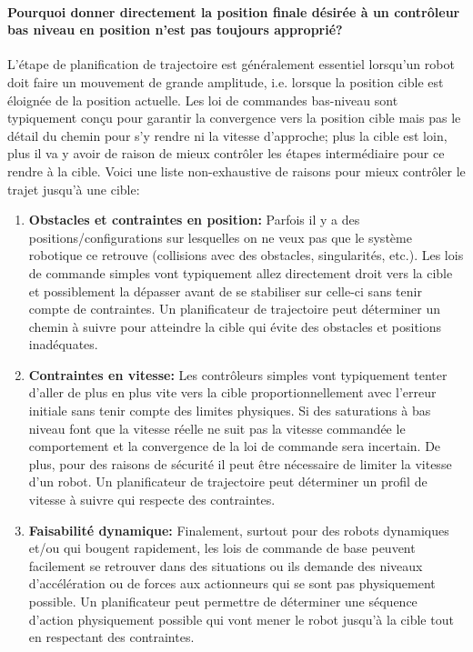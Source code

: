 \paragraph{Pourquoi donner directement la position finale désirée à un contrôleur bas niveau en position n'est pas toujours approprié?}
L'étape de planification de trajectoire est généralement essentiel lorsqu'un robot doit faire un mouvement de grande amplitude, i.e. lorsque la position cible est éloignée de la position actuelle. Les loi de commandes bas-niveau sont typiquement conçu pour garantir la convergence vers la position cible mais pas le détail du chemin pour s'y rendre ni la vitesse d'approche; plus la cible est loin, plus il va y avoir de raison de mieux contrôler les étapes intermédiaire pour ce rendre à la cible. Voici une liste non-exhaustive de raisons pour mieux contrôler le trajet jusqu'à une cible:
\begin{enumerate}
    \item \textbf{Obstacles et contraintes en position:} Parfois il y a des positions/configurations sur lesquelles on ne veux pas que le système robotique ce retrouve (collisions avec des obstacles, singularités, etc.). Les lois de commande simples vont typiquement allez directement droit vers la cible et possiblement la dépasser avant de se stabiliser sur celle-ci sans tenir compte de contraintes. Un planificateur de trajectoire peut déterminer un chemin à suivre pour atteindre la cible qui évite des obstacles et positions inadéquates.
    \item \textbf{Contraintes en vitesse:} Les contrôleurs simples vont typiquement tenter d'aller de plus en plus vite vers la cible proportionnellement avec l'erreur initiale sans tenir compte des limites physiques. Si des saturations à bas niveau font que la vitesse réelle ne suit pas la vitesse commandée le comportement et la convergence de la loi de commande sera incertain. De plus, pour des raisons de sécurité il peut être nécessaire de limiter la vitesse d'un robot. Un planificateur de trajectoire peut déterminer un profil de vitesse à suivre qui respecte des contraintes.
    \item \textbf{Faisabilité dynamique:} Finalement, surtout pour des robots dynamiques et/ou qui bougent rapidement, les lois de commande de base peuvent facilement se retrouver dans des situations ou ils demande des niveaux d'accélération ou de forces aux actionneurs qui se sont pas physiquement possible. Un planificateur peut permettre de déterminer une séquence d'action physiquement possible qui vont mener le robot jusqu'à la cible tout en respectant des contraintes.
\end{enumerate}

